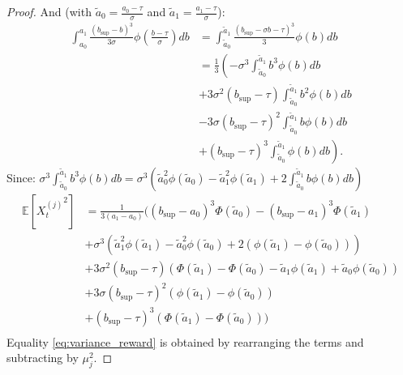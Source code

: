 \documentclass{statsmsc}
\begin{document}
\begin{proof}
  And (with $\tilde{a}_0 = \frac{a_{0} - \tau}{\sigma} $ and $\tilde{a}_1 = \frac{a_{1} - \tau}{\sigma}$):
  \begin{align*}
    \int_{a_0}^{a_1}  \frac{(b_{\sup}-b)^3}{3 \sigma} \phi\left(\frac{b - \tau}{\sigma}\right)db & = \int_{\tilde{a}_0}^{\tilde{a}_1}  \frac{(b_{\sup}- \sigma b - \tau)^3}{3} \phi\left(b\right)db \\
    & = \frac{1}{3}\left(- \sigma^3\int_{\tilde{a}_0}^{\tilde{a}_1} b^3 \phi\left(b\right)db\right. \\
    & + 3 \sigma^2 (b_{\sup}- \tau)\int_{\tilde{a}_0}^{\tilde{a}_1} b^2 \phi\left(b\right)db \\
    & - 3 \sigma (b_{\sup}- \tau)^2\int_{\tilde{a}_0}^{\tilde{a}_1} b \phi\left(b\right)db \\
    & + \left.(b_{\sup}- \tau)^3 \int_{\tilde{a}_0}^{\tilde{a}_1} \phi\left(b\right)db \right).
  \end{align*}
    Since: $\sigma^3\int_{\tilde{a}_0}^{\tilde{a}_1} b^3 \phi\left(b\right)db = \sigma^3 \left( \tilde{a}_0^2 \phi(\tilde{a}_0) -\tilde{a}_1^2 \phi(\tilde{a}_1) + 2 \int_{\tilde{a}_0}^{\tilde{a}_1} b \phi(b) db\right)$
  \begin{align*}
    \mathbb{E}\left[{X_t^{(j)}}^2\right] &= \frac{1}{3(a_1 - a_0)}\biggl( (b_{\sup}-a_0)^3 \Phi\left(\tilde{a}_0\right) - (b_{\sup}-a_1)^3 \Phi\left(\tilde{a}_1\right)\\
   & + \sigma^3 \left( \tilde{a}_1^2 \phi(\tilde{a}_1) -\tilde{a}_0^2 \phi(\tilde{a}_0) + 2 \left( \phi\left(\tilde{a}_1\right) - \phi\left(\tilde{a}_0\right)\right) \right)\\
   & + 3 \sigma^2 (b_{\sup}- \tau) \left( \Phi\left(\tilde{a}_1\right) -  \Phi\left(\tilde{a}_0\right) - \tilde{a}_1 \phi\left(\tilde{a}_1\right) + \tilde{a}_0 \phi\left(\tilde{a}_0\right)\right)\\
   & + 3 \sigma (b_{\sup}- \tau)^2 \left( \phi\left(\tilde{a}_1\right) - \phi\left(\tilde{a}_0\right)\right)\\
   & +  (b_{\sup}- \tau)^3 \left(\Phi\left(\tilde{a}_1\right) - \Phi\left(\tilde{a}_0\right) \right)\biggr)\\
  \end{align*}
  Equality \ref{eq:variance_reward} is obtained by rearranging the terms and subtracting by $\mu_j^2$.
\end{proof}
\end{document}
